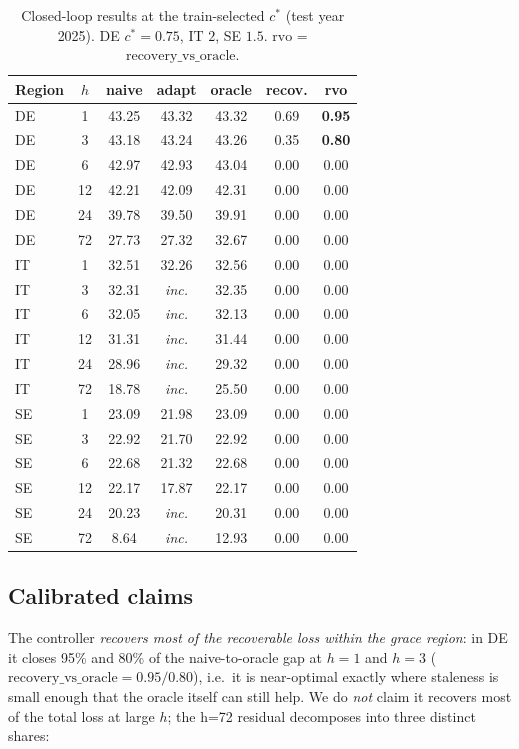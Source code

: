 \documentclass[sigconf,nonacm=false]{acmart}
\begin{document}
\begin{table}[t]
  \caption{Closed-loop results at the train-selected $c^*$ (test year 2025).
  DE $c^*{=}0.75$, IT $2$, SE $1.5$. $\mathrm{rvo}$ =
  $\mathrm{recovery\_vs\_oracle}$.}
  \label{tab:adaptive}
  \small
  \begin{tabular}{@{}l c c c c c c@{}}
    \toprule
    Region & $h$ & naive & adapt & oracle & recov. & rvo \\
    \midrule
    DE & 1 & 43.25 & 43.32 & 43.32 & 0.69 & \textbf{0.95} \\
    DE & 3 & 43.18 & 43.24 & 43.26 & 0.35 & \textbf{0.80} \\
    DE & 6 & 42.97 & 42.93 & 43.04 & 0.00 & 0.00 \\
    DE & 12 & 42.21 & 42.09 & 42.31 & 0.00 & 0.00 \\
    DE & 24 & 39.78 & 39.50 & 39.91 & 0.00 & 0.00 \\
    DE & 72 & 27.73 & 27.32 & 32.67 & 0.00 & 0.00 \\
    IT & 1 & 32.51 & 32.26 & 32.56 & 0.00 & 0.00 \\
    IT & 3 & 32.31 & \multicolumn{1}{c}{\emph{inc.}} & 32.35 & 0.00 & 0.00 \\
    IT & 6 & 32.05 & \emph{inc.} & 32.13 & 0.00 & 0.00 \\
    IT & 12 & 31.31 & \emph{inc.} & 31.44 & 0.00 & 0.00 \\
    IT & 24 & 28.96 & \emph{inc.} & 29.32 & 0.00 & 0.00 \\
    IT & 72 & 18.78 & \emph{inc.} & 25.50 & 0.00 & 0.00 \\
    SE & 1 & 23.09 & 21.98 & 23.09 & 0.00 & 0.00 \\
    SE & 3 & 22.92 & 21.70 & 22.92 & 0.00 & 0.00 \\
    SE & 6 & 22.68 & 21.32 & 22.68 & 0.00 & 0.00 \\
    SE & 12 & 22.17 & 17.87 & 22.17 & 0.00 & 0.00 \\
    SE & 24 & 20.23 & \emph{inc.} & 20.31 & 0.00 & 0.00 \\
    SE & 72 & 8.64 & \emph{inc.} & 12.93 & 0.00 & 0.00 \\
    \bottomrule
  \end{tabular}
\end{table}

\subsection{Calibrated claims}
The controller \emph{recovers most of the recoverable loss within the grace
region}: in DE it closes 95\% and 80\% of the naive-to-oracle gap at $h{=}1$ and
$h{=}3$ ($\mathrm{recovery\_vs\_oracle}=0.95/0.80$), i.e.\ it is near-optimal
exactly where staleness is small enough that the oracle itself can still help.
We do \emph{not} claim it recovers most of the total loss at large $h$; the
h=72 residual decomposes into three distinct shares:
\end{document}
